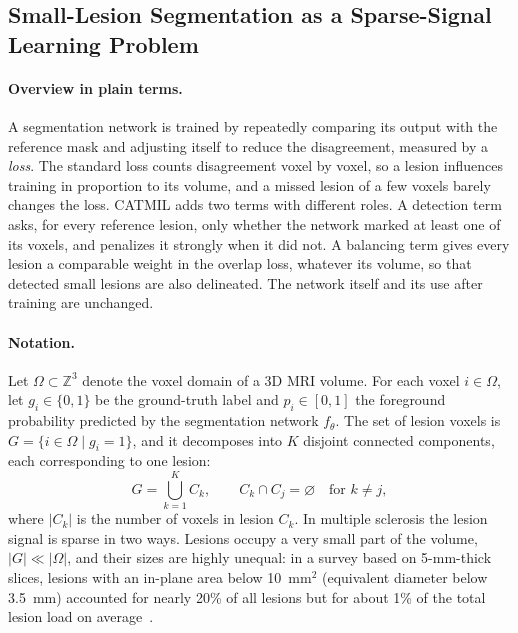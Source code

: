 \subsection{Small-Lesion Segmentation as a Sparse-Signal Learning Problem}
\label{sec:problem}

\paragraph{Overview in plain terms.}
A segmentation network is trained by repeatedly comparing its output with
the reference mask and adjusting itself to reduce the disagreement, measured
by a \emph{loss}. The standard loss counts disagreement voxel by voxel, so a
lesion influences training in proportion to its volume, and a missed lesion
of a few voxels barely changes the loss. CATMIL adds two terms with
different roles. A detection term asks, for every reference lesion, only
whether the network marked at least one of its voxels, and penalizes it
strongly when it did not. A balancing term gives every lesion a comparable
weight in the overlap loss, whatever its volume, so that detected small
lesions are also delineated. The network itself and its use after training
are unchanged.

\paragraph{Notation.}
Let $\Omega \subset \mathbb{Z}^{3}$ denote the voxel domain of a 3D MRI
volume. For each voxel $i \in \Omega$, let $g_i \in \{0,1\}$ be the
ground-truth label and $p_i \in [0,1]$ the foreground probability predicted
by the segmentation network $f_{\theta}$. The set of lesion voxels is
$G = \{ i \in \Omega \mid g_i = 1 \}$, and it decomposes into $K$ disjoint
connected components, each corresponding to one lesion:
\begin{equation}
G = \bigcup_{k=1}^{K} C_k,
\qquad
C_k \cap C_j = \varnothing \quad \text{for } k \neq j ,
\end{equation}
where $|C_k|$ is the number of voxels in lesion $C_k$. In multiple
sclerosis the lesion signal is sparse in two ways. Lesions occupy a very
small part of the volume, $|G| \ll |\Omega|$, and their sizes are highly
unequal: in a survey based on 5-mm-thick slices, lesions with an in-plane
area below 10~mm$^2$ (equivalent diameter below 3.5~mm) accounted for
nearly 20\% of all lesions but for about 1\% of the total lesion load on
average~\cite{wang_survey_1997}.

